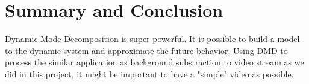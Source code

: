 \documentclass[twoside,twocolumn]{article}
\begin{document}
    \section{Summary and Conclusion}
    Dynamic Mode Decomposition is super powerful. It is possible to build a model to the dynamic system and 
    approximate the future behavior. Using DMD to process the similar application as background substraction
    to video stream as we did in this project, it might be important to have a "simple" video as possible.

    \mbox{~}
    \clearpage
    \begin{appendices}
        
    \end{appendices}
\end{document}
